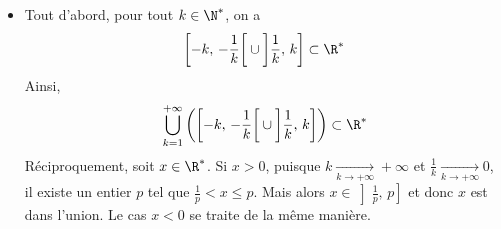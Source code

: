 {{\begin{itemize}
  \item Tout d'abord, pour tout $k\in \N^*$, on a \[ \left[-k,\,-\frac{1}{k}\right[ \cup \left]\frac{1}{k},\,k\right] \subset \R^* \]
  Ainsi, \[ \bigcup_{k=1}^{+\infty} \left( \left [-k,\,-\frac{1}{k}\right[ \cup \left]\frac{1}{k},\, k\right]\right) \subset \R^*\]
  Réciproquement, soit $x\in \R^*$. Si $x>0$, puisque $k\underset{k\to +\infty}{\longrightarrow} +\infty$ et $\frac{1}{k} \underset{k\to +\infty}{\longrightarrow} 0$, il existe un entier $p$ tel que $\frac{1}{p} < x \leq p$. Mais alors $x\in \left]\frac{1}{p},\,p\right]$ et donc $x$ est dans l'union. Le cas $x<0$ se traite de la même manière.
\end{itemize}
}
}

